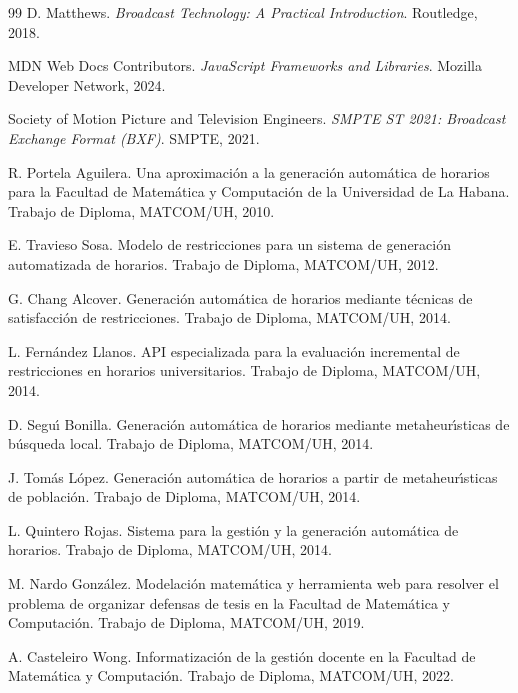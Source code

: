 \documentclass[12pt,a4paper]{report}
\theoremstyle{defstyle}
\begin{document}
\begin{thebibliography}{99}
D. Matthews.
\newblock \textit{Broadcast Technology: A Practical Introduction}.
\newblock Routledge, 2018.

{MDN Web Docs Contributors}.
\newblock \textit{JavaScript Frameworks and Libraries}.
\newblock Mozilla Developer Network, 2024.

{Society of Motion Picture and Television Engineers}.
\newblock \textit{SMPTE ST 2021: Broadcast Exchange Format (BXF)}.
\newblock SMPTE, 2021.

R. Portela Aguilera.
\newblock Una aproximaci\'on a la generaci\'on autom\'atica de horarios para
  la Facultad de Matem\'atica y Computaci\'on de la Universidad de La Habana.
\newblock Trabajo de Diploma, MATCOM/UH, 2010.

E. Travieso Sosa.
\newblock Modelo de restricciones para un sistema de generaci\'on automatizada
  de horarios.
\newblock Trabajo de Diploma, MATCOM/UH, 2012.

G. Chang Alcover.
\newblock Generaci\'on autom\'atica de horarios mediante t\'ecnicas de
  satisfacci\'on de restricciones.
\newblock Trabajo de Diploma, MATCOM/UH, 2014.

L. Fern\'andez Llanos.
\newblock API especializada para la evaluaci\'on incremental de restricciones
  en horarios universitarios.
\newblock Trabajo de Diploma, MATCOM/UH, 2014.

D. Segu\'{\i} Bonilla.
\newblock Generaci\'on autom\'atica de horarios mediante metaheur\'{\i}sticas
  de b\'usqueda local.
\newblock Trabajo de Diploma, MATCOM/UH, 2014.

J. Tom\'as L\'opez.
\newblock Generaci\'on autom\'atica de horarios a partir de metaheur\'{\i}sticas
  de poblaci\'on.
\newblock Trabajo de Diploma, MATCOM/UH, 2014.

L. Quintero Rojas.
\newblock Sistema para la gesti\'on y la generaci\'on autom\'atica de horarios.
\newblock Trabajo de Diploma, MATCOM/UH, 2014.

M. Nardo Gonz\'alez.
\newblock Modelaci\'on matem\'atica y herramienta web para resolver el
  problema de organizar defensas de tesis en la Facultad de Matem\'atica y
  Computaci\'on.
\newblock Trabajo de Diploma, MATCOM/UH, 2019.

A. Casteleiro Wong.
\newblock Informatizaci\'on de la gesti\'on docente en la Facultad de
  Matem\'atica y Computaci\'on.
\newblock Trabajo de Diploma, MATCOM/UH, 2022.


\end{thebibliography}
\end{document}
